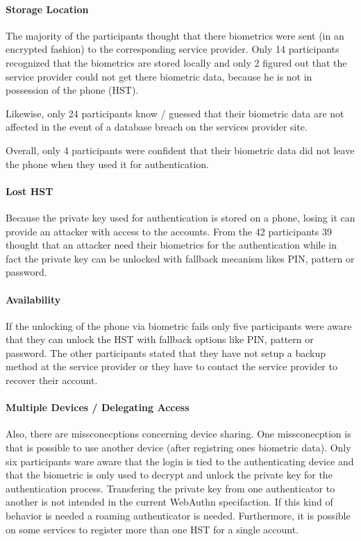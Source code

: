 \documentclass[runningheads]{llncs}
\begin{document}
\paragraph{Storage Location}
The majority of the participants thought that there biometrics were sent (in an encrypted fashion) to the corresponding service provider. Only 14 participants recognized that the biometrics are stored locally and only 2 figured out that the service provider could not get there biometric data, because he is not in possession of the phone (HST).

Likewise, only 24 participants know / guessed that their biometric data are not affected in the event of a database breach on the services provider site.

Overall, only 4 participants were confident that their biometric data did not leave the phone when they used it for authentication.

\paragraph{Lost HST}
Because the private key used for authentication is stored on a phone, losing it can provide an attacker with access to the accounts. From the 42 participants 39 thought that an attacker need their biometrics for the authentication while in fact the private key can be unlocked with fallback mecanism likes PIN, pattern or password.

\paragraph{Availability}
If the unlocking of the phone via biometric fails only five participants were aware that they can unlock the HST with fallback options like PIN, pattern or password. The other participants stated that they have not setup a backup method at the service provider or they have to contact the service provider to recover their account.

\paragraph{Multiple Devices / Delegating Access}
Also, there are missconecptions concerning device sharing. One missconecption is that is possible to use another device (after registring ones biometric data). Only six participants ware aware that the login is tied to the authenticating device and that the biometric is only used to decrypt and unlock the private key for the authentication process. Transfering the private key from one authenticator to another is not intended in the current WebAuthn specifaction. If this kind of behavior is needed a roaming authenticator is needed. Furthermore, it is possible on some services to register more than one HST for a single account.
\end{document}
